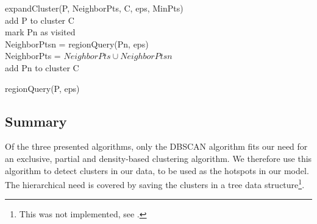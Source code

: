 \begin{algorithm}
expandCluster(P, NeighborPts, C, eps, MinPts)\\
	add P to cluster C\\
	{
		{
			mark Pn as visited\\
			NeighborPtsn = regionQuery(Pn, eps)\\
		}
		{
			NeighborPts = $ NeighborPts \cup NeighborPtsn $\\
			{add Pn to cluster C\\}
		}
	}
\end{algorithm}%

\begin{algorithm}
regionQuery(P, eps)\\
\end{algorithm}

\subsection{Summary} Of the three presented algorithms, only the DBSCAN algorithm fits our need for an exclusive, partial and density-based clustering algorithm.
We therefore use this algorithm to detect clusters in our data, to be used as the hotspots in our model.
The hierarchical need is covered by saving the clusters in a tree data structure\footnote{This was not implemented, see .}.
